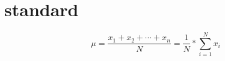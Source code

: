 \section{standard}
\begin{equation}
    \mu = \frac{x_{1} + x_{2} + \cdots + x_{n}}{N} = \frac{1}{N} * \sum_{i=1}^{N} x_{i}
\end{equation}